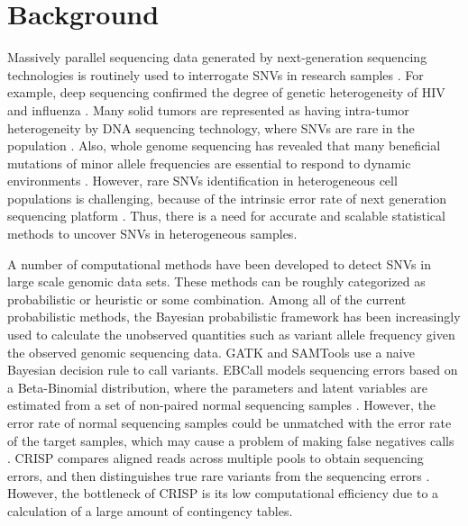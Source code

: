 \documentclass{bmcart}
\begin{document}

\section*{Background}
Massively parallel sequencing data generated by next-generation sequencing technologies is routinely used to interrogate SNVs in research samples \cite{koboldt2013next}.
For example, deep sequencing confirmed the degree of genetic heterogeneity of HIV and influenza \cite{flaherty2011ultrasensitive, ghedin2011deep}.
Many solid tumors are represented as having intra-tumor heterogeneity by DNA sequencing technology, where SNVs are rare in the population \cite{navin2010inferring}.
Also, whole genome sequencing has revealed that many beneficial mutations of minor allele frequencies are essential to respond to dynamic environments \cite{kvitek2013whole}.
However, rare SNVs identification in heterogeneous cell populations is challenging, because of the intrinsic error rate of next generation sequencing platform \cite{shendure2008next}.
Thus, there is a need for accurate and scalable statistical methods to uncover SNVs in heterogeneous samples.

A number of computational methods have been developed to detect SNVs in large scale genomic data sets.
These methods can be roughly categorized as probabilistic or heuristic or some combination.
Among all of the current probabilistic methods, the Bayesian probabilistic framework has been increasingly used to calculate the unobserved quantities such as variant allele frequency given the observed genomic sequencing data.
GATK \cite{mckenna2010genome} and SAMTools \cite{li2009sequence} use a naive Bayesian decision rule to call variants.
EBCall models sequencing errors based on a Beta-Binomial distribution, where the parameters and latent variables are estimated from a set of non-paired normal sequencing samples \cite{shiraishi2013empirical}.
However, the error rate of normal sequencing samples could be unmatched with the error rate of the target samples, which may cause a problem of making false negatives calls \cite{wang2013detecting}.
CRISP compares aligned reads across multiple pools to obtain sequencing errors, and then distinguishes true rare variants from the sequencing errors \cite{bansal2010statistical}.
However, the bottleneck of CRISP is its low computational efficiency due to a calculation of a large amount of contingency tables.
\end{document}

